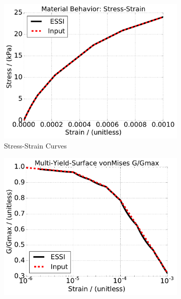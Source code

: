 \begin{figure}[!htbp]
    \centering
    \begin{subfigure}[b]{0.475\textwidth}
        \centering
        \includegraphics[width=\textwidth]{./Figure-files/Day3/Single_element_Models_illustrate_the_elastic-plastic_behavior/vmGGmax/1/backbone.pdf}
        \caption[]%
        {{\small Stress-Strain Curves}}    
    \end{subfigure}
    \hfill
    \begin{subfigure}[b]{0.475\textwidth}  
        \centering 
        \includegraphics[width=\textwidth]{./Figure-files/Day3/Single_element_Models_illustrate_the_elastic-plastic_behavior/vmGGmax/1/GGmax.pdf}

\end{subfigure}
\end{figure}
